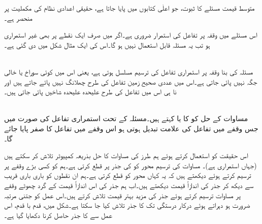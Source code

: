 متوسط قیمت مسئلے کا ثبوت، جو اعلٰی  کتابوں میں پایا جاتا ہے، حقیقی اعدادی نظام کی مکملیت پر منحصر ہے۔

اس مسئلے میں وقفہ  پر تفاعل  کی استمرار ضروری ہے۔اگر  میں صرف ایک نقطے پر بھی  غیر استمراری ہو تب یہ مسئلہ قابل استعمال نہیں ہو گا۔اس کی ایک مثال شکل  میں دی گئی ہے۔

\\
مسئلہ  کی بنا وقفہ  پر استمراری تفاعل کی ترسیم مسلسل ہوتی ہے، یعنی اس میں کوئی سوراخ یا خالی جگہ نہیں پائی جاتی ہے۔اس میں عددی صحیح زمین تفاعل  کی طرح چھلانگ  نہیں پائے جاتے ہیں اور نا ہی اس میں تفاعل  کی طرح علیحدہ علیحدہ شاخیں پائی جاتی ہیں۔

\\
مساوات  کے حل کو  کا  یا  کہتے ہیں۔مسئلہ  کے تحت استمراری تفاعل کی صورت میں جس وقفے میں تفاعل کی علامت  تبدیل ہوتی ہو اس وقفے میں تفاعل کا صفر پایا جائے گا۔

اس حقیقت کو استعمال کرتے ہوئے ہم   طرز کی مساوات کا حل بذریعہ کمپیوٹر تلاش کر سکتے ہیں  (جہاں  استمراری ہے)۔ مساوات کی ترسیم  محور کو  کی جذر پر قطع کرتی ہے۔ہم  کو کسی بڑے وقفے پر ترسیم کرتے ہوئے دیکھتے ہیں کہ یہ کہاں  محور کو قطع کرتی ہے۔ہم ان نقطوں  کو باری باری قریب سے دیکھ کر جذر کی اندازاً قیمت دیکھتے ہیں۔اب ہم جذر کی اس اندازاً  قیمت کے گرد چھوٹے وقفے پر مساوات ترسیم کرتے ہوئے جذر کی مزید بہتر قیمت تلاش کرتے ہیں۔اس عمل کو جتنی مرتبہ ضرورت ہو دہراتے ہوئے درکار درستگی تک کا جذر تلاش کیا جا سکتا ہے۔شکل  میں، قدم با قدم، اس عمل سے   کا  جذر حاصل کرنا دکھایا گیا ہے۔

